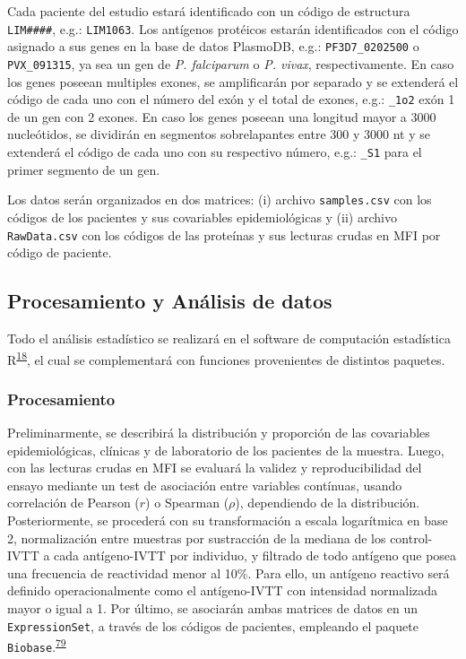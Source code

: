 \documentclass[]{article}
\begin{document}
Cada paciente del estudio estará identificado con un código de
estructura \texttt{LIM\#\#\#\#}, e.g.: \texttt{LIM1063}. Los antígenos
protéicos estarán identificados con el código asignado a sus genes en la
base de datos PlasmoDB, e.g.: \texttt{PF3D7\_0202500} o
\texttt{PVX\_091315}, ya sea un gen de \emph{P. falciparum} o \emph{P.
vivax}, respectivamente. En caso los genes poseean multiples exones, se
amplificarán por separado y se extenderá el código de cada uno con el
número del exón y el total de exones, e.g.: \texttt{\_1o2} exón 1 de un
gen con 2 exones. En caso los genes poseean una longitud mayor a 3000
nucleótidos, se dividirán en segmentos sobrelapantes entre 300 y 3000 nt
y se extenderá el código de cada uno con su respectivo número, e.g.:
\texttt{\_S1} para el primer segmento de un gen.

Los datos serán organizados en dos matrices: (i) archivo
\texttt{samples.csv} con los códigos de los pacientes y sus covariables
epidemiológicas y (ii) archivo \texttt{RawData.csv} con los códigos de
las proteínas y sus lecturas crudas en MFI por código de paciente.

\hypertarget{procanal}{\subsection{Procesamiento y Análisis de
datos}\label{procanal}}

Todo el análisis estadístico se realizará en el software de computación
estadística R\textsuperscript{\protect\hyperlink{ref-R}{18}}, el cual se
complementará con funciones provenientes de distintos paquetes.

\subsubsection{Procesamiento}\label{procesamiento}

Preliminarmente, se describirá la distribución y proporción de las
covariables epidemiológicas, clínicas y de laboratorio de los pacientes
de la muestra. Luego, con las lecturas crudas en MFI se evaluará la
validez y reproducibilidad del ensayo mediante un test de asociación
entre variables contínuas, usando correlación de Pearson (\(r\)) o
Spearman (\(\rho\)), dependiendo de la distribución. Posteriormente, se
procederá con su transformación a escala logarítmica en base 2,
normalización entre muestras por sustracción de la mediana de los
control-IVTT a cada antígeno-IVTT por individuo, y filtrado de todo
antígeno que posea una frecuencia de reactividad menor al 10\%. Para
ello, un antígeno reactivo será definido operacionalmente como el
antígeno-IVTT con intensidad normalizada mayor o igual a 1. Por último,
se asociarán ambas matrices de datos en un \texttt{ExpressionSet}, a
través de los códigos de pacientes, empleando el paquete
\texttt{Biobase}.\textsuperscript{\protect\hyperlink{ref-Biobase}{79}}
\end{document}
